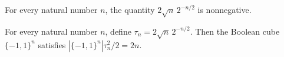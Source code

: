 \begin{theorem}
\label{FABL.randomBooleanFourierThreshold_nonneg}
\leanok
{}
For every natural number $n$, the quantity $2\sqrt{n}\,2^{-n/2}$ is nonnegative.
\end{theorem}

\begin{theorem}
\label{FABL.card_mul_randomBooleanFourierThreshold_sq_div_two}
\leanok
{}
For every natural number $n$, define $\tau_n=2\sqrt{n}\,2^{-n/2}$. Then the Boolean cube
$\{-1,1\}^n$ satisfies $|\{-1,1\}^n|\tau_n^2/2=2n$.
\end{theorem}

